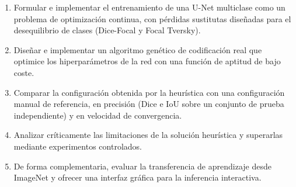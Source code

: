 \begin{enumerate}
  \item Formular e implementar el entrenamiento de una U-Net multiclase como un problema de optimización continua, con pérdidas sustitutas diseñadas para el desequilibrio de clases (Dice-Focal y Focal Tversky).
  \item Diseñar e implementar un algoritmo genético de codificación real que optimice los hiperparámetros de la red con una función de aptitud de bajo coste.
  \item Comparar la configuración obtenida por la heurística con una configuración manual de referencia, en precisión (Dice e IoU sobre un conjunto de prueba independiente) y en velocidad de convergencia.
  \item Analizar críticamente las limitaciones de la solución heurística y superarlas mediante experimentos controlados.
  \item De forma complementaria, evaluar la transferencia de aprendizaje desde ImageNet y ofrecer una interfaz gráfica para la inferencia interactiva.
\end{enumerate}
